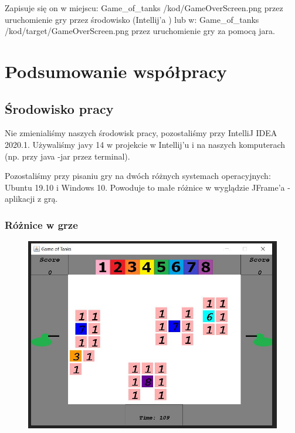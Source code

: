 \documentclass{article}
\begin{document}
Zapisuje się on w miejscu: Game\_of\_tanks \slash kod\slash GameOverScreen.png przez uruchomienie gry przez środowisko (Intellij'a ) lub w: Game\_of\_tanks \slash kod\slash target\slash GameOverScreen.png przez uruchomienie gry za pomocą jara.
\clearpage

\section{Podsumowanie współpracy} 

\subsection{Środowisko pracy}
Nie zmienialiśmy naszych środowisk pracy, pozostaliśmy przy IntelliJ IDEA 2020.1. Używaliśmy javy 14 w projekcie w Intellij'u i na naszych komputerach (np. przy java -jar przez terminal).

\par Pozostaliśmy przy pisaniu gry na dwóch różnych systemach operacyjnych: Ubuntu 19.10 i Windows 10. Powoduje to małe różnice w wyglądzie JFrame'a - aplikacji z grą.

\subsubsection{Różnice w grze}
\begin{figure} [hbt!]
    \includegraphics[width=15cm,center]{images/windowsApp.jpg}
\end{figure}

\clearpage
\end{document}
